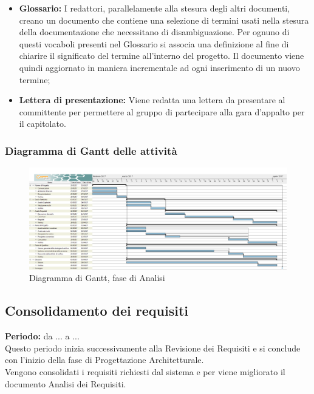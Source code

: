 \begin{itemize}
		\item \textbf{Glossario:} I redattori, parallelamente alla stesura degli altri documenti, creano un documento che contiene una selezione di termini usati nella stesura della documentazione che necessitano di disambiguazione. Per ognuno di questi vocaboli presenti nel Glossario si associa una definizione al fine di chiarire il significato del termine all'interno del progetto. Il documento viene quindi aggiornato in maniera incrementale ad ogni inserimento di un nuovo termine; \\
		\item \textbf{Lettera di presentazione:} Viene redatta una lettera da presentare al committente per permettere al gruppo di partecipare alla gara d'appalto per il capitolato. \\
	\end{itemize}
	\subsubsection{Diagramma di Gantt delle attività}
	\begin{figure}[H]
		\centering
		\includegraphics[width=1\linewidth]{immagini/gantt/analisi.png}
		\caption{Diagramma di Gantt, fase di Analisi}
	\end{figure}
	\subsection{Consolidamento dei requisiti}
	\textbf{Periodo:} da ... a ... \\
	Questo periodo inizia successivamente alla Revisione dei Requisiti e si conclude con l'inizio della fase di Progettazione Architetturale. \\
	Vengono consolidati i requisiti richiesti dal sistema e per viene migliorato il documento Analisi dei Requisiti. \\
